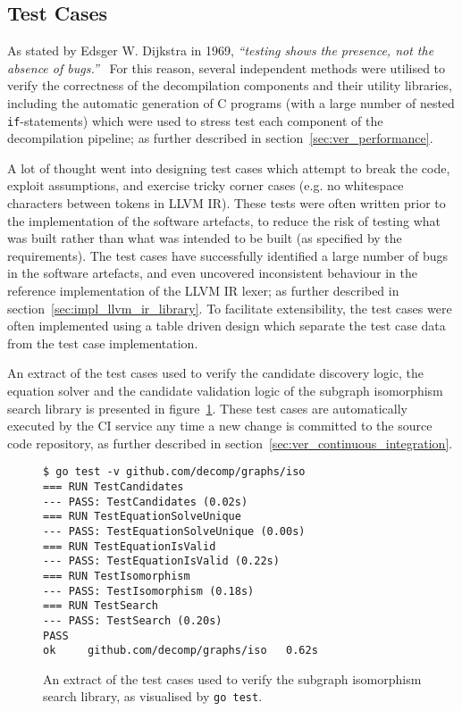 
\subsection{Test Cases}

As stated by Edsger W. Dijkstra in 1969, \textit{``testing shows the presence, not the absence of bugs.''}~\cite{absence_of_bugs_quote} For this reason, several independent methods were utilised to verify the correctness of the decompilation components and their utility libraries, including the automatic generation of C programs (with a large number of nested \texttt{if}-statements) which were used to stress test each component of the decompilation pipeline; as further described in section~\ref{sec:ver_performance}.

A lot of thought went into designing test cases which attempt to break the code, exploit assumptions, and exercise tricky corner cases (e.g. no whitespace characters between tokens in LLVM IR). These tests were often written prior to the implementation of the software artefacts, to reduce the risk of testing what was built rather than what was intended to be built (as specified by the requirements). The test cases have successfully identified a large number of bugs in the software artefacts, and even uncovered inconsistent behaviour in the reference implementation of the LLVM IR lexer; as further described in section~\ref{sec:impl_llvm_ir_library}. To facilitate extensibility, the test cases were often implemented using a table driven design which separate the test case data from the test case implementation.

An extract of the test cases used to verify the candidate discovery logic, the equation solver and the candidate validation logic of the subgraph isomorphism search library is presented in figure~\ref{fig:iso_test_cases}. These test cases are automatically executed by the CI service any time a new change is committed to the source code repository, as further described in section~\ref{sec:ver_continuous_integration}.

\begin{figure}[htbp]
	\begin{center}
		\begin{BVerbatim}
$ go test -v github.com/decomp/graphs/iso
=== RUN TestCandidates
--- PASS: TestCandidates (0.02s)
=== RUN TestEquationSolveUnique
--- PASS: TestEquationSolveUnique (0.00s)
=== RUN TestEquationIsValid
--- PASS: TestEquationIsValid (0.22s)
=== RUN TestIsomorphism
--- PASS: TestIsomorphism (0.18s)
=== RUN TestSearch
--- PASS: TestSearch (0.20s)
PASS
ok     github.com/decomp/graphs/iso   0.62s
		\end{BVerbatim}
		\caption{An extract of the test cases used to verify the subgraph isomorphism search library, as visualised by \texttt{go test}.}
		\label{fig:iso_test_cases}
	\end{center}
\end{figure}



